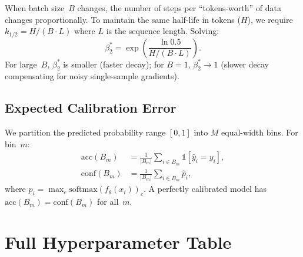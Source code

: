\documentclass[10pt,twocolumn]{article}
\newcommand{\ind}{\mathbb{1}}
\begin{document}
When batch size~$B$ changes, the number of steps per
``tokens-worth'' of data changes proportionally.  To maintain
the same half-life in tokens ($H$), we require
$k_{1/2} = H / (B \cdot L)$ where $L$ is the sequence length.
Solving:
\begin{equation}
  \beta_2^* = \exp\!\left(\frac{\ln 0.5}{H / (B \cdot L)}\right).
\end{equation}
For large~$B$, $\beta_2^*$ is smaller (faster decay); for
$B=1$, $\beta_2^* \to 1$ (slower decay compensating for noisy
single-sample gradients).

\subsection{Expected Calibration Error}
\label{app:ece_derivation}

We partition the predicted probability range $[0,1]$ into
$M$ equal-width bins.  For bin~$m$:
\begin{align}
  \mathrm{acc}(B_m) &= \frac{1}{|B_m|}
    \sum_{i \in B_m} \ind[\hat{y}_i = y_i], \\
  \mathrm{conf}(B_m) &= \frac{1}{|B_m|}
    \sum_{i \in B_m} \hat{p}_i,
\end{align}
where $\hat{p}_i = \max_c \mathrm{softmax}(f_\theta(x_i))_c$.
A perfectly calibrated model has
$\mathrm{acc}(B_m) = \mathrm{conf}(B_m)$ for all~$m$.

\section{Full Hyperparameter Table}
\label{app:hyperparams}
\end{document}
